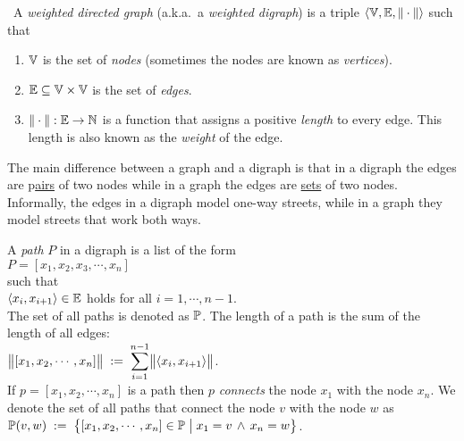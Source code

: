 \begin{Definition} \
  A \emph{weighted directed graph} (a.k.a.~a \emph{weighted digraph}) is a triple 
  $\langle {\mathbb V}, {\mathbb E}, \|\cdot\| \rangle$ such that
  \begin{enumerate}
  \item ${\mathbb V}$ is the set of \emph{nodes} (sometimes the nodes are known as \emph{vertices}).
  \item ${\mathbb E} \subseteq {\mathbb V} \times {\mathbb V}$ is the set of \emph{edges}.
  \item $\|\cdot\|: {\mathbb E} \rightarrow {\mathbb N}$ is a function that assigns a positive \emph{length} 
        to every edge.  This length is also known as the \emph{weight} of the edge.
        \eox
  \end{enumerate}
\end{Definition}

\remark
The main difference between a graph and a digraph is that in a digraph the edges are 
\mbox{p\hspace{-0.15cm}\underline{\hspace{0.15cm}airs}} of two
nodes while in a graph the edges are \underline{sets} of two nodes.  Informally, the edges in a
digraph model one-way streets, while in a graph they model streets that work both ways.
\eox

\begin{Definition}
 A \emph{path} $P$ in a digraph is a list of the form 
\\[0.2cm]
\hspace*{1.3cm} 
$P = [ x_1, x_2, x_3, \cdots, x_n ]$ 
\\[0.2cm]
such that
\\[0.2cm]
\hspace*{1.3cm} $\pair(x_i,x_{i+1}) \in \edges$ \quad holds for all $i = 1, \cdots, n-1$. 
\\[0.2cm]
The set of all paths is denoted as ${\mathbb P}$.
The length of a path is the sum of the length of all edges:
\\[0.2cm]
\hspace*{1.3cm}
$\ds\Weight{[x_1,x_2, \cdots, x_n]} \df \sum\limits_{i=1}^{n-1} \Weight{\pair(x_i,x_{i+1})}$. 
\\[0.2cm]
If  $p = [x_1, x_2, \cdots, x_n]$ is a path then  $p$ \emph{connects} the node $x_1$ with the node
$x_n$.  We denote the set of all paths that connect the node $v$ with the node $w$ as
\\[0.2cm]
\hspace*{1.3cm} 
 ${\mathbb P}(v,w) \;:=\; \bigl\{ [x_1, x_2, \cdots, x_n] \in {\mathbb P} \bigm| x_1 = v \,\wedge\, x_n = w \bigr\}$.
\end{Definition}

